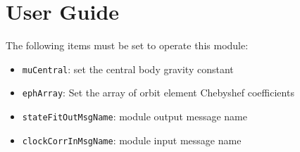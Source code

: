 
\section{User Guide}
The following items must be set to operate this module:
\begin{itemize}
	\item {\tt muCentral}: set the central body gravity constant
	\item {\tt ephArray}: Set the array of orbit element Chebyshef coefficients
	\item {\tt stateFitOutMsgName}: module output message name
	\item {\tt clockCorrInMsgName}: module input message name
\end{itemize}